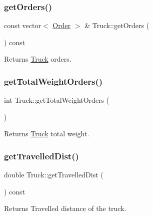 \subsubsection{\texorpdfstring{get\+Orders()}{getOrders()}}
{\footnotesize\ttfamily const vector$<$ \hyperlink{class_order}{Order} $>$ \& Truck\+::get\+Orders (\begin{DoxyParamCaption}{ }\end{DoxyParamCaption}) const}

\begin{DoxyReturn}{Returns}
\hyperlink{class_truck}{Truck} orders. 
\end{DoxyReturn}
\mbox{\label{class_truck_aaf7fec768243188128d40344216daeaf}} 
\subsubsection{\texorpdfstring{get\+Total\+Weight\+Orders()}{getTotalWeightOrders()}}
{\footnotesize\ttfamily int Truck\+::get\+Total\+Weight\+Orders (\begin{DoxyParamCaption}{ }\end{DoxyParamCaption})}

\begin{DoxyReturn}{Returns}
\hyperlink{class_truck}{Truck} total weight. 
\end{DoxyReturn}
\mbox{\label{class_truck_a7564742600274c25fd7cdd85d7e5391a}} 
\subsubsection{\texorpdfstring{get\+Travelled\+Dist()}{getTravelledDist()}}
{\footnotesize\ttfamily double Truck\+::get\+Travelled\+Dist (\begin{DoxyParamCaption}{ }\end{DoxyParamCaption}) const}

\begin{DoxyReturn}{Returns}
Travelled distance of the truck. 
\end{DoxyReturn}
\mbox{\label{class_truck_a91423efd30332b934bc3114ffccd4816}} 
